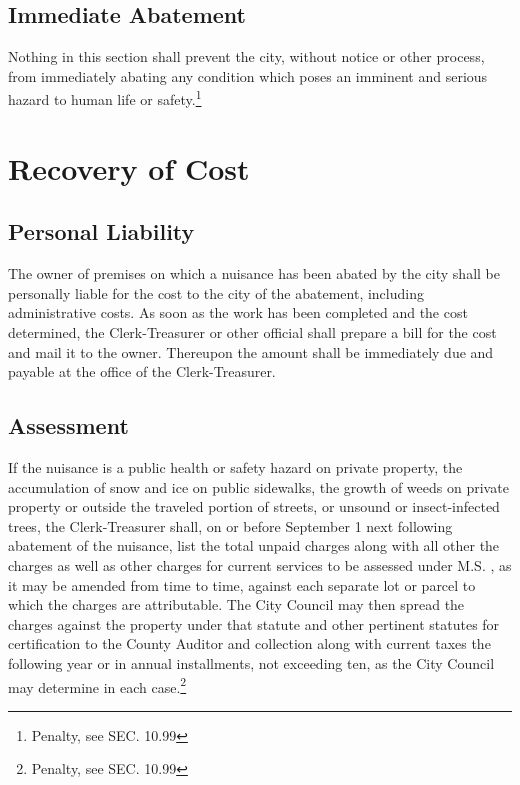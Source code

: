 \subsection{Immediate Abatement}
Nothing in this section shall prevent the city, without notice or other process, from immediately abating any condition which poses an imminent and serious hazard to human life or safety.\footnote{Penalty, see SEC. 10.99}

\section{Recovery of Cost}
\subsection{Personal Liability}
The owner of premises on which a nuisance has been abated by the city shall be personally liable for the cost to the city of the abatement, including administrative costs.  As soon as the work has been completed and the cost determined, the Clerk-Treasurer or other official shall prepare a bill for the cost and mail it to the owner.  Thereupon the amount shall be immediately due and payable at the office of the Clerk-Treasurer.
\subsection{Assessment}
If the nuisance is a public health or safety hazard on private property, the accumulation of snow and ice on public sidewalks, the growth of weeds on private property or outside the traveled portion of streets, or unsound or insect-infected trees, the Clerk-Treasurer shall, on or before September 1 next following abatement of the nuisance, list the total unpaid charges along with all other the charges as well as other charges for current services to be assessed under M.S. , as it may be amended from time to time, against each separate lot or parcel to which the charges are attributable.  The City Council may then spread the charges against the property under that statute and other pertinent statutes for certification to the County Auditor and collection along with current taxes the following year or in annual installments, not exceeding ten, as the City Council may determine in each case.\footnote{Penalty, see SEC. 10.99}\\


